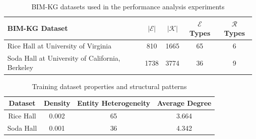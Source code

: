 \begin{table}[!ht]
\centering
\caption{\ac{BIM-KG} datasets used in the performance analysis experiments}
\begin{tabular}{l|c|c|c|c}
\hline \hline \textbf{\ac{BIM-KG} Dataset} & \textbf{$|\mathcal{E}|$} & \textbf{$|\mathcal{K}|$} & \textbf{$\mathcal{E}$} Types & \textbf{$\mathcal{R}$} Types \bigstrut \\
\hline Rice Hall at University of Virginia & 810 & 1665 & 65 & 6 \\
Soda Hall at University of California, Berkeley & 1738 & 3774 & 36 & 9 \bigstrut \\
\hline
\end{tabular}
\label{BIM-KG-datasets}
\end{table}

\begin{table}[!ht]
    \centering
    \caption{Training dataset properties and structural patterns}
    \begin{tabular}{c|c|c|c}
    \hline \hline
        \textbf{Dataset} & \textbf{Density} & \textbf{Entity Heterogeneity} & \textbf{Average Degree} \bigstrut \\
        \hline
        Rice Hall & 0.002 & 65 & 3.664 \\
        
        Soda Hall & 0.001 & 36 & 4.342 \\
        \hline
    \end{tabular}
    \label{tab:BIM-KG-datasets_structural_patterns}
\end{table}

